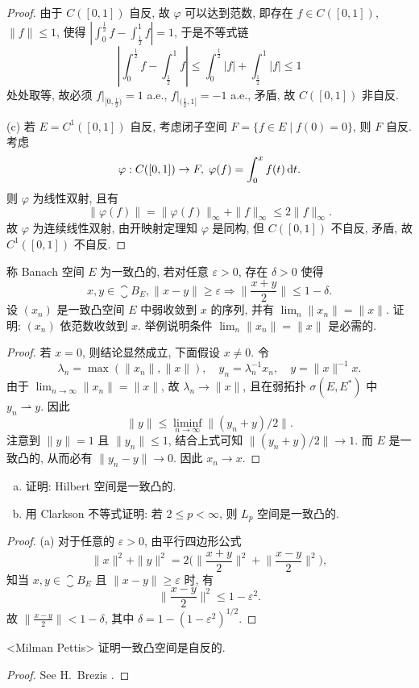 \begin{proof}
    由于 $C([0,1])$ 自反, 故 $\varphi$ 可以达到范数, 即存在 $f\in C([0,1])$, $\|f\|\leq 1$, 使得
    $|\int_0^{\frac{1}{2}}f-\int_{\frac{1}{2}}^1 f|=1$, 于是不等式链
    \[\left|\int_0^{\frac{1}{2}}f-\int_{\frac{1}{2}}^1f\right|\leq\int_0^{\frac{1}{2}}|f|+\int_{\frac{1}{2}}^1 |f|\leq 1\]
    处处取等, 故必须 $f|_{[0,\frac{1}{2})}=1$ a.e., $f|_{(\frac{1}{2},1]}=-1$ a.e.,
    矛盾, 故 $C([0,1])$ 非自反.

    (c) 若 $E=C^1([0,1])$ 自反, 考虑闭子空间 $F=\{f\in E\mid f(0)=0\}$, 则 $F$ 自反.
    考虑
    \[\varphi: C([0,1])\to F,\;\varphi(f)=\int_0^x f(t)\mathop{}\!\mathrm{d} t.\]
    则 $\varphi$ 为线性双射, 且有
    \[\|\varphi(f)\|=\|\varphi(f)\|_{\infty}+\|f\|_{\infty}\leq 2\|f\|_{\infty}.\]
    故 $\varphi$ 为连续线性双射, 由开映射定理知 $\varphi$ 是同构, 但 $C([0,1])$ 不自反,
    矛盾, 故 $C^1([0,1])$ 不自反.
\end{proof}


\begin{exercise}[16]
  称 Banach 空间 $E$ 为一致凸的, 若对任意 $\varepsilon>0$, 存在 $\delta>0$ 使得
  \[x,y\in\closure{B}_E, \|x-y\|\geq\varepsilon
    \Longrightarrow\biggl\|\frac{x+y}{2}\biggr\|\leq 1-\delta.\]
  设 $(x_n)$ 是一致凸空间 $E$ 中弱收敛到 $x$ 的序列, 并有 $\lim_n\|x_n\| = \|x\|$.
  证明: $(x_n)$ 依范数收敛到 $x$. 举例说明条件 $\lim_n\|x_n\|=\|x\|$ 是必需的.
\end{exercise}

\begin{proof}
  若 $x = 0$, 则结论显然成立, 下面假设 $x\neq 0$. 令
  \[\lambda_n = \max(\|x_n\|, \|x\|),\quad y_n = \lambda_n^{-1}x_n,
    \quad y = \|x\|^{-1}x.\]
  由于 $\lim_{n\to\infty}\|x_n\| = \|x\|$,
  故 $\lambda_n\to \|x\|$, 且在弱拓扑 $\sigma(E,E^*)$ 中 $y_n\rightharpoonup y$. 因此
  \[\|y\| \leq \liminf_{n\to\infty} \|(y_n+y)/2\|.\]
  注意到 $\|y\|=1$ 且 $\|y_n\|\leq 1$, 结合上式可知 $\|(y_n+y)/2\|\to 1$.
  而 $E$ 是一致凸的, 从而必有 $\|y_n-y\|\to 0$. 因此 $x_n\to x$.
\end{proof}


\begin{exercise}
  \begin{enumerate}[(a)]
    \item 证明: Hilbert 空间是一致凸的.
    \item 用 Clarkson 不等式证明: 若 $2\leq p<\infty$, 则 $L_p$ 空间是一致凸的.
  \end{enumerate}
\end{exercise}

\begin{proof}
  (a) 对于任意的 $\varepsilon>0$, 由平行四边形公式
  \[\|x\|^2 + \|y\|^2 = 2\biggl(\biggl\|\frac{x+y}{2}\biggr\|^2
    + \biggl\|\frac{x-y}{2}\biggr\|^2\biggr),\]
  知当 $x,y\in\closure{B}_E$ 且 $\|x-y\|\geq\varepsilon$ 时, 有
  \[\biggl\|\frac{x-y}{2}\biggr\|^2 \leq 1-\varepsilon^2.\]
  故 $\bigl\|\frac{x-y}{2}\bigr\| < 1-\delta$, 其中 $\delta = 1-(1-\varepsilon^2)^{1/2}$.
\end{proof}


\begin{exercise}<Milman Pettis>
  证明一致凸空间是自反的.
\end{exercise}

\begin{proof}
  See H.~Brezis \cite[Theorem 3.31]{brezis_functional_2011}.
\end{proof}
